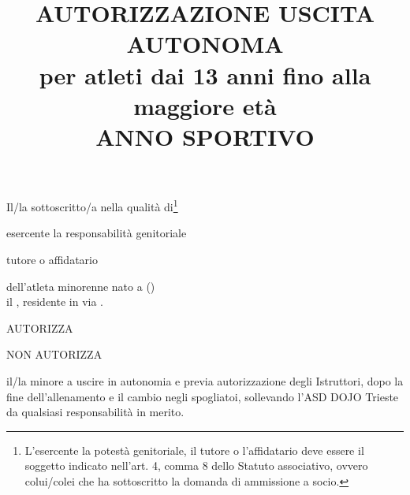 \documentclass{djtsmod}
\title{AUTORIZZAZIONE USCITA AUTONOMA\\[10pt] \normalsize per atleti dai 13 anni fino alla maggiore età\\ ANNO SPORTIVO \field{1in}}
\begin{document}
	\maketitle
	
	Il/la sottoscritto/a \fieldfill\; nella qualità di\footnote{L'esercente la potestà genitoriale, il tutore o l'affidatario deve essere il soggetto indicato nell'art. 4, comma 8 dello Statuto associativo, ovvero colui/colei che ha sottoscritto la domanda di ammissione a socio.}
	\begin{radiolist}
		\item esercente la responsabilità genitoriale  
		\item tutore o affidatario
	\end{radiolist}
	dell'atleta minorenne \fieldfill\; nato a \field{1.5in} (\field{0.5in}) \\
	il \field{1.5in}, residente in \field{2in} via \fieldfill.
	
	\vspace{0.5in}
	\begin{radiolist}
		\item AUTORIZZA
		\item NON AUTORIZZA
	\end{radiolist}
	il/la minore a uscire in autonomia e previa autorizzazione degli Istruttori, dopo la fine dell'allenamento e il cambio negli spogliatoi, sollevando l'ASD DOJO Trieste da qualsiasi responsabilità in merito.
	
	\vspace{1in}
	
\end{document}
